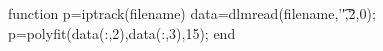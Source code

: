 %
%
%
%

function p=iptrack(filename)
    data=dlmread(filename,'\t',2,0);
    p=polyfit(data(:,2),data(:,3),15);
end